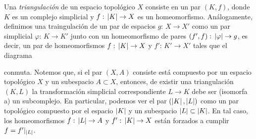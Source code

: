Una \emph{triangulaci\'{o}n} de un espacio topol\'{o}gico $X$ consiste en un
par $(K,f)$, donde $K$ es un complejo simplicial y $f:\,\left|K\right|\rightarrow X$
es un homeomorfismo. An\'{a}logamente, definimos una traingulaci\'{o}n
de un par de espacios $g:\,X\rightarrow X'$ como un par simplicial
$\varphi:\,K\rightarrow K'$ junto con un homeomorfismo de pares
$(f',f):\,\left|\varphi\right|\rightarrow g$, es decir, un par de homeomorfismos
$f:\,\left|K\right|\rightarrow X$ y $f':\,K'\rightarrow X'$ tales que el diagrama
\begin{center}
\end{center}
conmuta. Notemos que, si el par $(X,A)$ consiste est\'{a} compuesto por
un espacio topol\'{o}gico $X$ y un subespacio $A\subset X$, entonces,
de existir una triangulaci\'{o}n $(K,L)$ la transformaci\'{o}n simplicial
correspondiente $L\rightarrow K$ debe ser (isomorfa a) un subcomplejo.
En particular, podemos ver el par $(\left|K\right|,\left|L\right|)$ como un par
topol\'{o}gico compuesto por el espacio $\left|K\right|$ y un subespacio
$\left|L\right|\subset\left|K\right|$. En tal caso, los homeomorfismos
$f:\,\left|L\right|\rightarrow A$ y $f':\,\left|K\right|\rightarrow X$ est\'{a}n
forzados a cumplir $f=f'|_{\left|L\right|}$.
